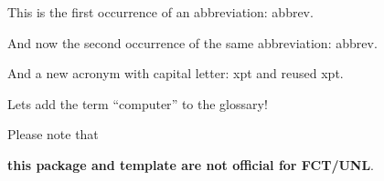 

This is the first occurrence of an abbreviation: \gls{abbrev}.

And now the second occurrence of the same abbreviation: \gls{abbrev}.

And a new acronym with capital letter: \Gls{xpt} and reused \gls{xpt}.

Lets add the term ``\gls{computer}'' to the glossary!

Please note that 
\begin{center}
	\textbf{\large this package and template are not official for FCT/UNL}.
\end{center}
